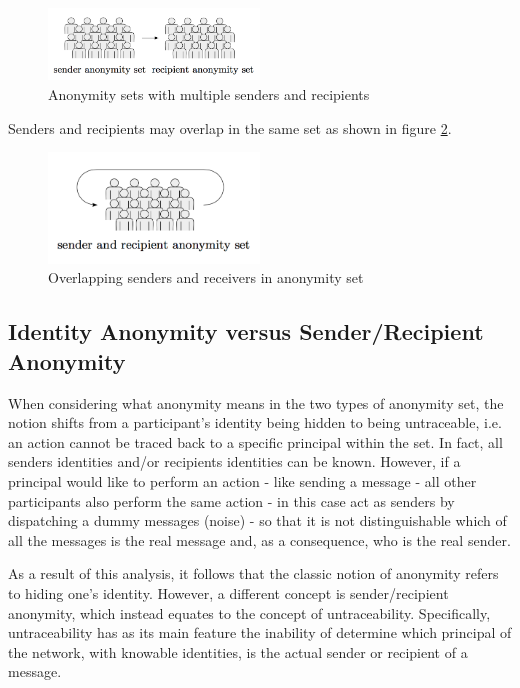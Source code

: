 \begin{figure}[h]
    \centering
    \includegraphics[width=0.50\textwidth]{Images/ManyToManyAnonymSet.png}
    \caption{Anonymity sets with multiple senders and recipients \cite{Franck}}
    \label{fig:anonymityLevel}
\end{figure}

Senders and recipients may overlap in the same set as shown in figure \ref{fig:overlappingAnonSet}.

\begin{figure}[h]
    \centering
    \includegraphics[width=0.50\textwidth]{Images/overlappingAnonymSet.png}
    \caption{Overlapping senders and receivers in anonymity set \cite{Franck}}
    \label{fig:overlappingAnonSet}
\end{figure}


\subsection{Identity Anonymity versus Sender/Recipient Anonymity}
When considering what anonymity means in the two types of anonymity set, the notion shifts from a participant's identity being hidden to being untraceable, i.e. an action cannot be traced back to a specific principal within the set. In fact, all senders identities and/or recipients identities can be known. However, if a principal would like to perform an action - like sending a message - all other participants also perform the same action - in this case act as senders by dispatching a dummy messages (noise) - so that it is not distinguishable which of all the messages is the real message and, as a consequence, who is the real sender.

As a result of this analysis, it follows that the classic notion of anonymity refers to hiding one's identity. However, a different concept is sender/recipient anonymity, which instead equates to the concept of untraceability. Specifically, untraceability has as its main feature the inability of determine which principal of the network, with  knowable identities, is the actual sender or recipient of a message. \newline 


